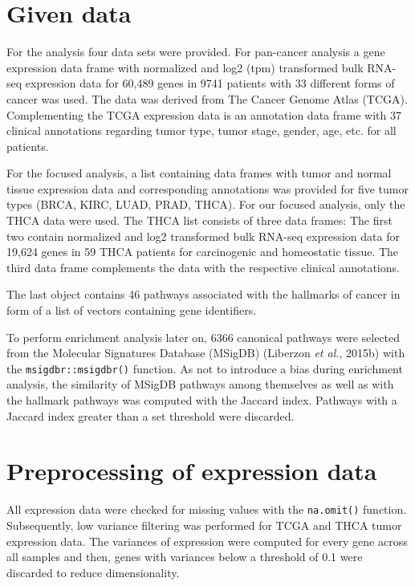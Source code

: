 \documentclass[
  parskip,
  oneside]{scrreprt}
\begin{document}
\hypertarget{given-data}{%
\section{Given data}\label{given-data}}

For the analysis four data sets were provided. For pan-cancer analysis a
gene expression data frame with normalized and log2 (tpm) transformed
bulk RNA-seq expression data for 60,489 genes in 9741 patients with 33
different forms of cancer was used. The data was derived from The Cancer
Genome Atlas (TCGA). Complementing the TCGA expression data is an
annotation data frame with 37 clinical annotations regarding tumor type,
tumor stage, gender, age, etc. for all patients.

For the focused analysis, a list containing data frames with tumor and
normal tissue expression data and corresponding annotations was provided
for five tumor types (BRCA, KIRC, LUAD, PRAD, THCA). For our focused
analysis, only the THCA data were used. The THCA list consists of three
data frames: The first two contain normalized and log2 transformed bulk
RNA-seq expression data for 19,624 genes in 59 THCA patients for
carcinogenic and homeostatic tissue. The third data frame complements
the data with the respective clinical annotations.

The last object contains 46 pathways associated with the hallmarks of
cancer in form of a list of vectors containing gene identifiers.

To perform enrichment analysis later on, 6366 canonical pathways were
selected from the Molecular Signatures Database (MSigDB) (Liberzon
\emph{et al.}, 2015b) with the \texttt{msigdbr::msigdbr()} function. As
not to introduce a bias during enrichment analysis, the similarity of
MSigDB pathways among themselves as well as with the hallmark pathways
was computed with the Jaccard index. Pathways with a Jaccard index
greater than a set threshold were discarded.

\hypertarget{preprocessing-of-expression-data}{%
\section{Preprocessing of expression
data}\label{preprocessing-of-expression-data}}

All expression data were checked for missing values with the
\texttt{na.omit()} function. Subsequently, low variance filtering was
performed for TCGA and THCA tumor expression data. The variances of
expression were computed for every gene across all samples and then,
genes with variances below a threshold of 0.1 were discarded to reduce
dimensionality.
\end{document}
